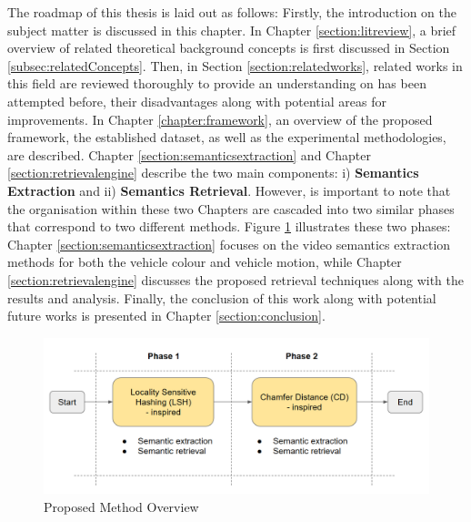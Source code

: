 The roadmap of this thesis is laid out as follows: Firstly, the introduction on the subject matter is discussed in this chapter.
In Chapter \ref{section:litreview}, a brief overview of related theoretical background concepts is first discussed in Section \ref{subsec:relatedConcepts}. Then, in Section \ref{section:relatedworks}, related works in this field are reviewed thoroughly to provide an understanding on has been attempted before, their disadvantages along with potential areas for improvements.
In Chapter \ref{chapter:framework}, an overview of the proposed framework, the established dataset, as well as the experimental methodologies, are described.
Chapter \ref{section:semanticsextraction} and Chapter \ref{section:retrievalengine} describe the two main components: i) \textbf{Semantics Extraction} and ii) \textbf{Semantics Retrieval}. However, is important to note that the organisation within these two Chapters are cascaded into two similar phases that correspond to two different methods.
Figure \ref{fig:proposedmethodoverview} illustrates these two phases: Chapter \ref{section:semanticsextraction} focuses on the video semantics extraction methods for both the vehicle colour and vehicle motion, while Chapter \ref{section:retrievalengine} discusses the proposed retrieval techniques along with the results and analysis.
Finally, the conclusion of this work along with potential future works is presented in Chapter \ref{section:conclusion}.



\begin{figure}[!hbt]\centering
\includegraphics[width=\textwidth]{image/general/phases.PNG}
\caption{Proposed Method Overview}
\label{fig:proposedmethodoverview}
\end{figure}
